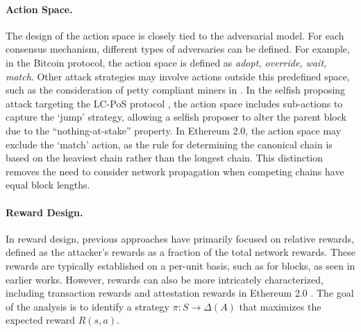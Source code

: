 \paragraph{Action Space.}
The design of the action space is closely tied to the adversarial model. 
For each consensus mechanism, different types of adversaries can be defined. 
For example, in the Bitcoin protocol, the action space is defined as {\textit{adopt, override, wait, match}}. 
Other attack strategies may involve actions outside this predefined space, such as the consideration of petty compliant miners in \cite{bar2023deep}. 
In the selfish proposing attack targeting the LC-PoS protocol \cite{sarenche2024deep}, the action space includes sub-actions to capture the `jump' strategy, allowing a selfish proposer to alter the parent block due to the ``nothing-at-stake'' property. 
In Ethereum 2.0, the action space may exclude the `match' action, as the rule for determining the canonical chain is based on the heaviest chain rather than the longest chain. 
This distinction removes the need to consider network propagation when competing chains have equal block lengths.

\paragraph{Reward Design.}
In reward design, previous approaches have primarily focused on relative rewards, defined as the attacker's rewards as a fraction of the total network rewards. 
These rewards are typically established on a per-unit basis, such as for blocks, as seen in earlier works. 
However, rewards can also be more intricately characterized, including transaction rewards \cite{bar2022werlman} and attestation rewards in Ethereum 2.0 \cite{zhang2024max}. 
The goal of the analysis is to identify a strategy $\pi: S \to \Delta(A)$ that maximizes the expected reward $R(s,a)$. 


